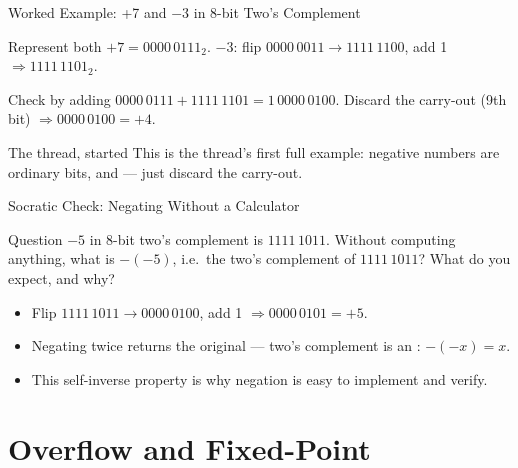 \documentclass[aspectratio=169]{beamer}
\begin{document}
\begin{frame}{Worked Example: +7 and $-3$ in 8-bit Two's Complement}
  \begin{block}{Represent both}
    $+7 = 0000\,0111_2$. $-3$: flip $0000\,0011 \to 1111\,1100$, add 1
    $\Rightarrow 1111\,1101_2$.
  \end{block}
  \begin{exampleblock}{Check by adding}
    $0000\,0111 + 1111\,1101 = 1\,0000\,0100$. Discard the carry-out
    (9th bit) $\Rightarrow 0000\,0100 = +4$. 
  \end{exampleblock}
  \vspace{0.2cm}
  \begin{alertblock}{The thread, started}
    This is the thread's first full example: negative numbers are ordinary
    bits, and  --- just
    discard the carry-out.
  \end{alertblock}
\end{frame}

\begin{frame}{Socratic Check: Negating Without a Calculator}
  \begin{alertblock}{Question}
    $-5$ in 8-bit two's complement is $1111\,1011$. Without computing anything,
    what is $-(-5)$, i.e.\ the two's complement of $1111\,1011$? What do you
    expect, and why?
  \end{alertblock}
  \begin{itemize}
    \item Flip $1111\,1011 \to 0000\,0100$, add 1 $\Rightarrow 0000\,0101 = +5$.
    \item Negating twice returns the original --- two's complement is an
      : $-(-x) = x$.
    \item This self-inverse property is why negation is easy to implement and
      verify.
  \end{itemize}
\end{frame}


\section{Overflow and Fixed-Point}
\end{document}
